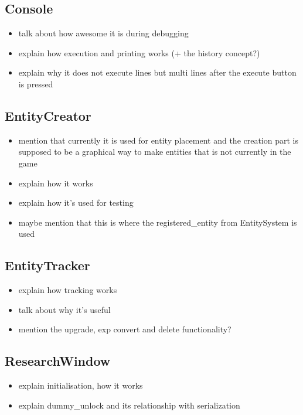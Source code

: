 \subsection{Console}

\begin{itemize}
    \item talk about how awesome it is during debugging
    \item explain how execution and printing works (+ the history concept?)
    \item explain why it does not execute lines but multi lines after the execute
        button is pressed
\end{itemize}

\subsection{EntityCreator}

\begin{itemize}
    \item mention that currently it is used for entity placement and
        the creation part is supposed to be a graphical way to make entities that
        is not currently in the game
    \item explain how it works
    \item explain how it's used for testing
    \item maybe mention that this is where the registered\_entity from EntitySystem
        is used
\end{itemize}

\subsection{EntityTracker}

\begin{itemize}
    \item explain how tracking works
    \item talk about why it's useful
    \item mention the upgrade, exp convert and delete functionality?
\end{itemize}

\subsection{ResearchWindow}

\begin{itemize}
    \item explain initialisation, how it works
    \item explain dummy\_unlock and its relationship with serialization
\end{itemize}

